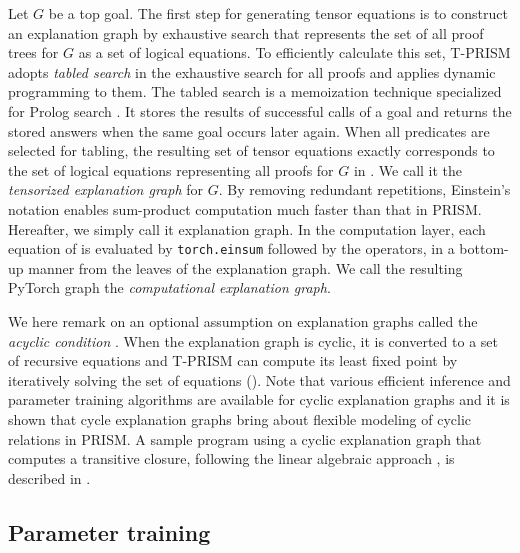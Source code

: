 \documentclass[a4paper]{report}
\begin{document}
Let $G$ be a top goal.  The first step for generating tensor equations
is  to  construct  an  explanation graph  by  exhaustive  search  that
represents the  set of  all proof trees  for $G$ as  a set  of logical
equations.  To efficiently  calculate  this set,  T-PRISM adopts  {\em
	tabled search\/} in  the exhaustive search for all  proofs and applies
dynamic  programming  to them.  The  tabled  search is  a  memoization
technique specialized for Prolog  search \cite{Zhou08}.  It stores the
results of successful  calls of a goal and returns  the stored answers
when  the same  goal  occurs  later again.   When  all predicates  are
selected for  tabling, the resulting  set of tensor  equations exactly
corresponds to  the set of  logical equations representing  all proofs
for $G$ in .  We  call it the {\em tensorized
	explanation  graph\/} for  $G$.   By  removing redundant  repetitions,
Einstein's notation  enables sum-product computation much  faster than
that in PRISM.  Hereafter, we simply call it explanation graph.
In the computation layer, each equation of 
is evaluated by {\tt torch.einsum} followed by the operators, in a
bottom-up manner from the leaves of the explanation graph.  We call the
resulting PyTorch graph the {\em computational explanation graph}.

We here remark on an  optional assumption on explanation graphs called
the {\it  acyclic condition\/}  \cite{Sato08a}.  When  the explanation
graph is cyclic,  it is converted to a set  of recursive equations and
T-PRISM can compute  its least fixed point by  iteratively solving the
set of equations ().  Note that various efficient inference and parameter
training   algorithms    are   available   for    cyclic   explanation
graphs \cite{sato2014infinite,kojimaprefix} and it is shown that cycle
explanation   graphs  bring   about   flexible   modeling  of   cyclic
relations \cite{kojima2015goal} in PRISM.  A sample program using a
cyclic explanation graph that computes a transitive closure, following
the linear algebraic approach \cite{sato2017linear}, is described in
.

\subsection*{Parameter training}
\label{sec:training_concept}
\end{document}
